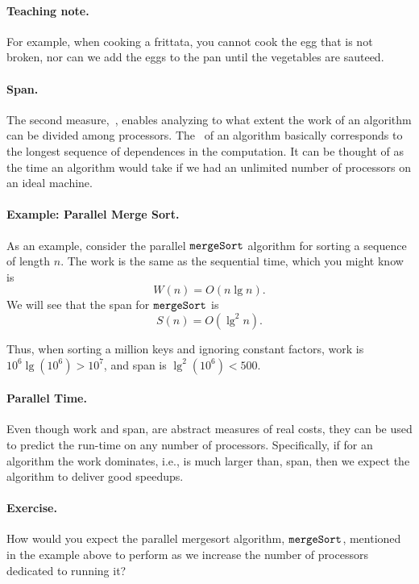 \paragraph{Teaching note.}
For example, when cooking a frittata, you cannot cook the egg that is
not broken, nor can we add the eggs to the pan until the vegetables
are sauteed.

\paragraph{Span.}
The second measure,~, enables analyzing to what extent the
work of an algorithm can be divided among processors.  The~
of an algorithm basically corresponds to the longest sequence of
dependences in the computation.  It can be thought of as the time an
algorithm would take if we had an unlimited number of processors on an
ideal machine.

\paragraph{Example: Parallel Merge Sort.}
As an example, consider the parallel $\texttt{mergeSort}$ algorithm for
sorting a sequence of length $n$.  The work is the same as the
sequential time, which you might know is
\[
W(n) = O(n \lg{n}).
\] 
%
We will see that the span for
$\texttt{mergeSort}$ is
\[
S(n) = O(\lg^2{n}).
\]

Thus, when  sorting a million keys and ignoring constant factors, 
work is $10^6\lg (10^6) > 10^7$, and 
%
span is 
$\lg^2(10^6) < 500.$
%

\paragraph{Parallel Time.}
Even though work and span, are abstract measures of real costs, they
can be used to predict the run-time on any number of processors.
%
Specifically, if for an algorithm the work dominates, i.e., is much
larger than, span, then we expect the algorithm to deliver good
speedups.


\paragraph{Exercise.}
How would you expect the parallel mergesort algorithm, $\texttt{mergeSort}$,
mentioned in the example above to perform as we increase the number of
processors dedicated to running it?

